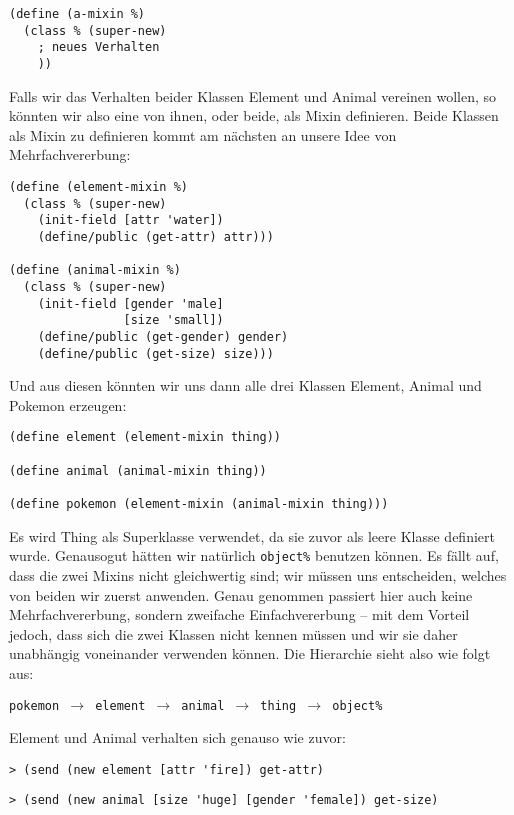 \begin{lstlisting}
(define (a-mixin %)
  (class % (super-new)
    ; neues Verhalten
    ))
\end{lstlisting}

Falls wir das Verhalten beider Klassen Element und Animal vereinen wollen, so könnten wir also eine von ihnen, oder beide, als Mixin definieren. Beide Klassen als Mixin zu definieren kommt am nächsten an unsere Idee von Mehrfachvererbung:

\begin{lstlisting}
(define (element-mixin %)
  (class % (super-new)
    (init-field [attr 'water])
    (define/public (get-attr) attr)))

(define (animal-mixin %)
  (class % (super-new)
    (init-field [gender 'male]
                [size 'small])
    (define/public (get-gender) gender)
    (define/public (get-size) size)))
\end{lstlisting}

Und aus diesen könnten wir uns dann alle drei Klassen Element, Animal und Pokemon erzeugen:
\begin{lstlisting}
(define element (element-mixin thing))

(define animal (animal-mixin thing))
 
(define pokemon (element-mixin (animal-mixin thing)))
\end{lstlisting}

Es wird Thing als Superklasse verwendet, da sie zuvor als leere Klasse definiert wurde. Genausogut hätten wir natürlich \texttt{object\%} benutzen können. Es fällt auf, dass die zwei Mixins nicht gleichwertig sind; wir müssen uns entscheiden, welches von beiden wir zuerst anwenden. Genau genommen passiert hier auch keine Mehrfachvererbung, sondern zweifache Einfachvererbung -- mit dem Vorteil jedoch, dass sich die zwei Klassen nicht kennen müssen und wir sie daher unabhängig voneinander verwenden können. Die Hierarchie sieht also wie folgt aus:

\texttt{pokemon $\rightarrow$ element $\rightarrow$ animal $\rightarrow$ thing $\rightarrow$ object\%}

Element und Animal verhalten sich genauso wie zuvor:

\begin{lstlisting}
> (send (new element [attr 'fire]) get-attr)
\end{lstlisting} 
{}

\begin{lstlisting}
> (send (new animal [size 'huge] [gender 'female]) get-size)
\end{lstlisting} 
{}

